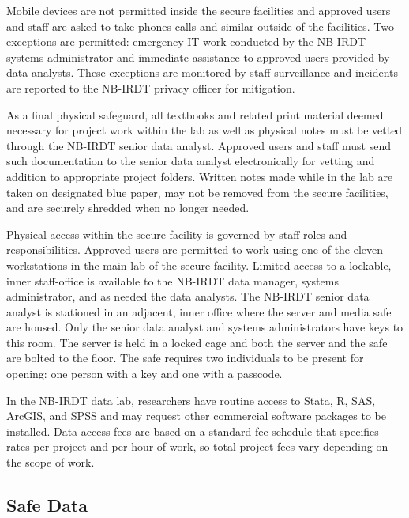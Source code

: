 Mobile devices are not permitted inside the secure facilities and approved users and staff are asked to take phones calls and similar outside of the facilities. Two exceptions are permitted: emergency IT work conducted by the NB-IRDT systems administrator and immediate assistance to approved users provided by data analysts. These exceptions are monitored by staff surveillance and incidents are reported to the NB-IRDT privacy officer for mitigation.

As a final physical safeguard, all textbooks and related print material deemed necessary for project work within the lab as well as physical notes must be vetted through the NB-IRDT senior data analyst. Approved users and staff must send such documentation to the senior data analyst electronically for vetting and addition to appropriate project folders. Written notes made while in the lab are taken on designated blue paper, may not be removed from the secure facilities, and are securely shredded when no longer needed.

Physical access within the secure facility is governed by staff roles and responsibilities. Approved users are permitted to work using one of the eleven workstations in the main lab of the secure facility. Limited access to a lockable, inner staff-office is available to the NB-IRDT data manager, systems administrator, and as needed the data analysts. The NB-IRDT senior data analyst is stationed in an adjacent, inner office where the server and media safe are housed. Only the senior data analyst and systems administrators have keys to this room. The server is held in a locked cage and both the server and the safe are bolted to the floor. The safe requires two individuals to be present for opening: one person with a key and one with a passcode. ~~

In the NB-IRDT data lab, researchers have routine access to Stata, R, SAS, ArcGIS, and SPSS and may request other commercial software packages to be installed. Data access fees are based on a standard fee schedule that specifies rates per project and per hour of work, so total project fees vary depending on the scope of work.

\hypertarget{nbirdt-safedata}{%
\subsection{Safe Data}\label{nbirdt-safedata}}

